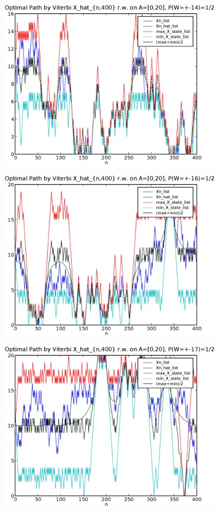 \documentclass[a4paper,10pt]{article}
\begin{document}
\begin{figure}[p]
\includegraphics[width=1\textwidth]{hw7_2_K_20_L_14_T_400.eps}
\caption{}\label{f3}
\end{figure}

\begin{figure}
\includegraphics[width=1\textwidth]{hw7_2_K_20_L_16_T_400.eps}
\caption{}\label{f4}
\end{figure}

\begin{figure}
\includegraphics[width=1\textwidth]{hw7_2_K_20_L_17_T_400.eps}
\caption{}\label{f5}
\end{figure}
\end{document}
